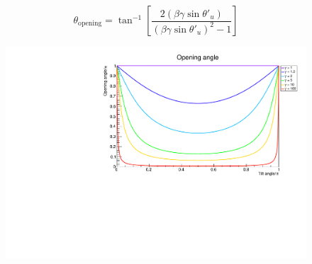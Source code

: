\documentclass[12pt]{article}
\begin{document}
\begin{equation}\label{eq:result}
  \boxed{
    \theta_\mathrm{opening}
    = \tan^{-1}\left[
      \frac{2(\beta\gamma\sin\theta'_u)}{(\beta\gamma\sin\theta'_u)^2 - 1}
    \right]
  }
\end{equation}

\begin{figure}[H]
  \centering
  \includegraphics[width=\textwidth]{fig/opening_angle.pdf}
\end{figure}
\end{document}
